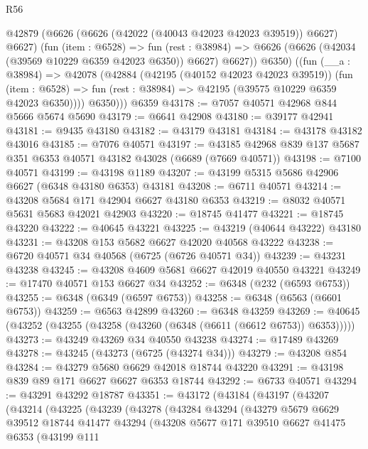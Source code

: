 \begin{lexlean}{R56}
\begin{coremodule}
        @42879
          (@6626 (@6626 (@42022 (@40043 @42023 @42023 @39519)) @6627) @6627)
          (fun (item : @6528) =>
          fun (rest : @38984) =>
          @6626 (@6626 (@42034 (@39569 @10229 @6359 @42023 @6350)) @6627) @6627))
          @6350)
        ((fun (__a : @38984) =>
        @42078
          (@42884
            (@42195 (@40152 @42023 @42023 @39519))
            (fun (item : @6528) =>
            fun (rest : @38984) => @42195 (@39575 @10229 @6359 @42023 @6350))))
          @6350)))
    @6359
@43178 := @7057 @40571 @42968 @844 @5666 @5674 @5690
@43179 := @6641 @42908
@43180 := @39177 @42941
@43181 := @9435 @43180
@43182 := @43179 @43181
@43184 := @43178 @43182 @43016
@43185 := @7076 @40571
@43197 := @43185 @42968 @839 @137 @5687 @351 @6353 @40571 @43182 @43028 (@6689 (@7669 @40571))
@43198 := @7100 @40571
@43199 := @43198 @1189
@43207 := @43199 @5315 @5686 @42906 @6627 (@6348 @43180 @6353) @43181
@43208 := @6711 @40571
@43214 := @43208 @5684 @171 @42904 @6627 @43180 @6353
@43219 := @8032 @40571 @5631 @5683 @42021 @42903
@43220 := @18745 @41477
@43221 := @18745 @43220
@43222 := @40645 @43221
@43225 := @43219 (@40644 @43222) @43180
@43231 := @43208 @153 @5682 @6627 @42020 @40568 @43222
@43238 := @6720 @40571 @34 @40568 (@6725 (@6726 @40571 @34))
@43239 := @43231 @43238
@43245 := @43208 @4609 @5681 @6627 @42019 @40550 @43221
@43249 := @17470 @40571 @153 @6627 @34
@43252 := @6348 (@232 (@6593 @6753))
@43255 := @6348 (@6349 (@6597 @6753))
@43258 := @6348 (@6563 (@6601 @6753))
@43259 := @6563 @42899
@43260 := @6348 @43259
@43269 := @40645 (@43252 (@43255 (@43258 (@43260 (@6348 (@6611 (@6612 @6753)) @6353)))))
@43273 := @43249 @43269 @34 @40550 @43238
@43274 := @17489 @43269
@43278 := @43245 (@43273 (@6725 (@43274 @34)))
@43279 := @43208 @854
@43284 := @43279 @5680 @6629 @42018 @18744 @43220
@43291 := @43198 @839 @89 @171 @6627 @6627 @6353 @18744
@43292 := @6733 @40571
@43294 := @43291 @43292 @18787
@43351 := @43172
    (@43184
      (@43197
        (@43207
          (@43214
            (@43225
              (@43239
                (@43278
                  (@43284
                    @43294
                    (@43279
                      @5679
                      @6629
                      @39512
                      @18744
                      @41477
                      @43294
                      (@43208
                        @5677
                        @171
                        @39510
                        @6627
                        @41475
                        @6353
                        (@43199
                          @111

\end{coremodule}
\end{lexlean}
